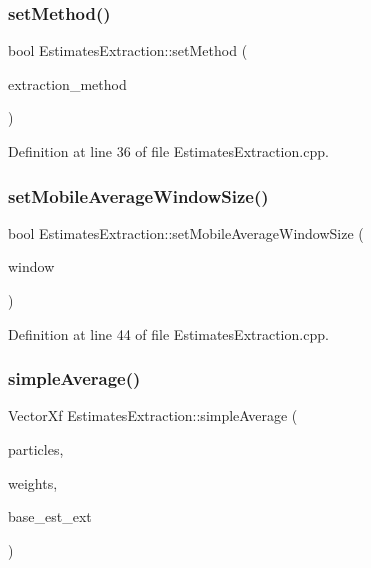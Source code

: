 \subsubsection{\texorpdfstring{set\+Method()}{setMethod()}}
{\footnotesize\ttfamily bool Estimates\+Extraction\+::set\+Method (\begin{DoxyParamCaption}\item[{const \mbox{\hyperlink{classbfl_1_1EstimatesExtraction_a8489976af4025f0bbc3288ff7f17ffb0}{Extraction\+Method}} \&}]{extraction\+\_\+method }\end{DoxyParamCaption})}



Definition at line 36 of file Estimates\+Extraction.\+cpp.

\mbox{\label{classbfl_1_1EstimatesExtraction_a49babb0803c50d697b8d21014010f5bb}} 
\subsubsection{\texorpdfstring{set\+Mobile\+Average\+Window\+Size()}{setMobileAverageWindowSize()}}
{\footnotesize\ttfamily bool Estimates\+Extraction\+::set\+Mobile\+Average\+Window\+Size (\begin{DoxyParamCaption}\item[{const int}]{window }\end{DoxyParamCaption})}



Definition at line 44 of file Estimates\+Extraction.\+cpp.

\mbox{\label{classbfl_1_1EstimatesExtraction_ab35b532eeb7025105a74c2919c15f51f}} 
\subsubsection{\texorpdfstring{simple\+Average()}{simpleAverage()}}
{\footnotesize\ttfamily Vector\+Xf Estimates\+Extraction\+::simple\+Average (\begin{DoxyParamCaption}\item[{const Eigen\+::\+Ref$<$ const Eigen\+::\+Matrix\+Xf $>$ \&}]{particles,  }\item[{const Eigen\+::\+Ref$<$ const Eigen\+::\+Vector\+Xf $>$ \&}]{weights,  }\item[{const \mbox{\hyperlink{classbfl_1_1EstimatesExtraction_a8c0593a43166c569530947107c830462}{Statistics}} \&}]{base\+\_\+est\+\_\+ext }\end{DoxyParamCaption})\hspace{0.3cm}{\ttfamily [protected]}}



